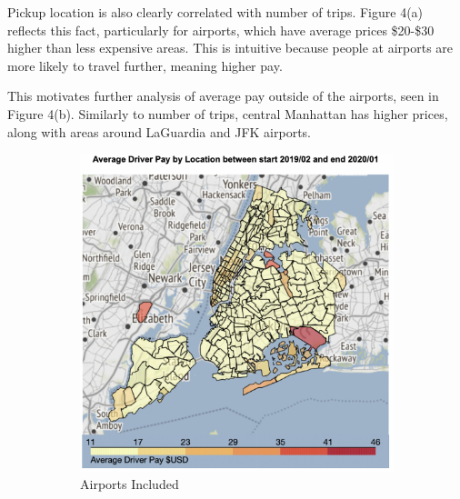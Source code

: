 \documentclass[11pt]{article}
\begin{document}
Pickup location is also clearly correlated with number of trips. Figure 4(a) reflects this fact, particularly for airports, which have average prices \$20-\$30 higher than less expensive areas. This is intuitive because people at airports are more likely to travel further, meaning higher pay.

This motivates further analysis of average pay outside of the airports, seen in Figure 4(b). Similarly to number of trips, central Manhattan has higher prices, along with areas around LaGuardia and JFK airports.

\begin{figure}[h]
\centering
\begin{subfigure}{.5\textwidth}
  \centering
  \includegraphics[width=1\linewidth]{plots/avg_pay_map.png}
  \caption{Airports Included}
  \label{fig:sub1}
\end{subfigure}%
\begin{subfigure}{.5\textwidth}
  \centering

\end{subfigure}
\end{figure}
\end{document}
